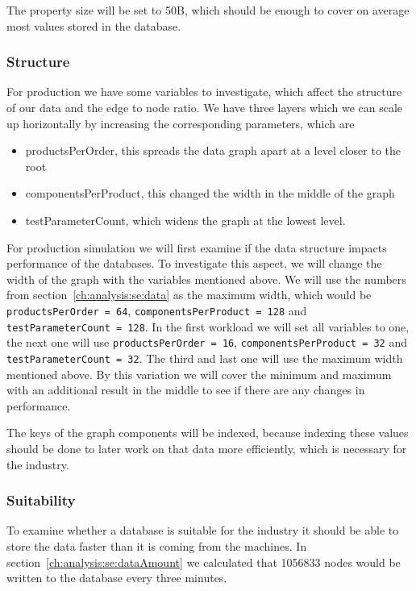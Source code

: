 The property size will be set to 50B,
which should be enough to cover on average most values stored in the database.

\subsubsection{Structure}
For production we have some variables to investigate,
which affect the structure of our data and the edge to node ratio.
We have three layers which we can scale up horizontally by increasing the corresponding parameters,
which are

\begin{itemize}
  \item productsPerOrder, this spreads the data graph apart at a level closer to the root
  \item componentsPerProduct, this changed the width in the middle of the graph
  \item testParameterCount, which widens the graph at the lowest level.
\end{itemize}

For production simulation we will first examine if the data structure impacts performance of the databases.
To investigate this aspect,
we will change the width of the graph with the variables mentioned above.
We will use the numbers from section~\ref{ch:analysis:se:data} as the maximum width,
which would be \texttt{productsPerOrder = 64},
\texttt{componentsPerProduct = 128} and \texttt{testParameterCount = 128}.
In the first workload we will set all variables to one,
the next one will use \texttt{productsPerOrder = 16},
\texttt{componentsPerProduct = 32} and \texttt{testParameterCount = 32}.
The third and last one will use the maximum width mentioned above.
By this variation we will cover the minimum and maximum with an additional result in the middle to see if there are any changes in performance.

The keys of the graph components will be indexed,
because indexing these values should be done to later work on that data more efficiently,
which is necessary for the industry.

\subsubsection{Suitability}
\label{ch:design:se:suitability}
To examine whether a database is suitable for the industry it should be able to store the data faster than it is coming from the machines.
In section~\ref{ch:analysis:se:dataAmount} we calculated that 1056833 nodes would be written to the database every three minutes.

